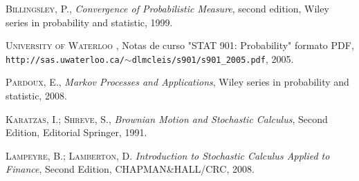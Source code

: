 \documentclass[a4paper]{article}
\numberwithin{equation}{subsection}
\begin{document}
\newpage
\begin{thebibliography}{X}
 \textsc{Billingsley, P.},
\textit{Convergence of Probabilistic Measure}, second edition,
Wiley series in probability and statistic, 1999.

 \textsc{University of Waterloo} ,
Notas de curso "STAT 901: Probability" formato PDF,
\texttt{http://sas.uwaterloo.ca/$\sim$dlmcleis/s901/s901\_2005.pdf}, 2005.

 \textsc{Pardoux, E.}, \textit{Markov Processes and Applications},
Wiley series in probability and statistic, 2008.

 \textsc{Karatzas, I.};\textsc{ Shreve, S.}, \textit{Brownian Motion and Stochastic Calculus}, Second Edition, Editorial Springer, 1991.

 \textsc{Lampeyre, B.; Lamberton, D.} \textit{Introduction to Stochastic Calculus Applied to Finance}, Second Edition, CHAPMAN&HALL/CRC, 2008.
\end{thebibliography}
\end{document}
